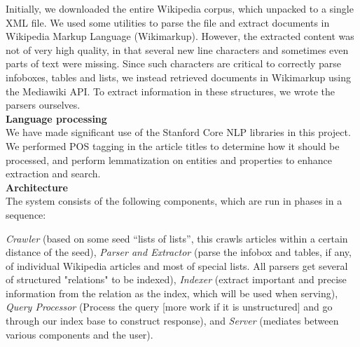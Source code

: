 \documentclass[11pt,twocolumn]{article}
\begin{document}
Initially, we downloaded the entire Wikipedia corpus, which unpacked to a single XML file. We used some utilities to parse the file and extract documents in Wikipedia Markup Language (Wikimarkup). However, the extracted content was not of very high quality, in that several new line characters and sometimes even parts of text were missing. Since such characters are critical to correctly parse infoboxes, tables and lists, we instead retrieved documents in Wikimarkup using the Mediawiki API. To extract information in these structures, we wrote the parsers ourselves.\\

{\bf Language processing}\\

We have made significant use of the Stanford Core NLP libraries in this project. We performed POS tagging in the article titles to determine how it should be processed, and perform lemmatization on entities and properties to enhance extraction and search.\\

{\bf Architecture}\\

The system consists of the following components, which are run in phases in a sequence:

\emph{Crawler} (based on some seed ``lists of lists'', this crawls articles within a certain distance of the seed), \emph{Parser and Extractor} (parse the infobox and tables, if any, of individual Wikipedia articles and most of special lists. All parsers get several of structured "relations" to be indexed), \emph{Indexer} (extract important and precise information from the relation as the index, which will be used when serving), \emph{Query Processor}  (Process the query [more work if it is unstructured] and go through our index base to construct response), and \emph{Server} (mediates between various components and the user).




\end{document}
